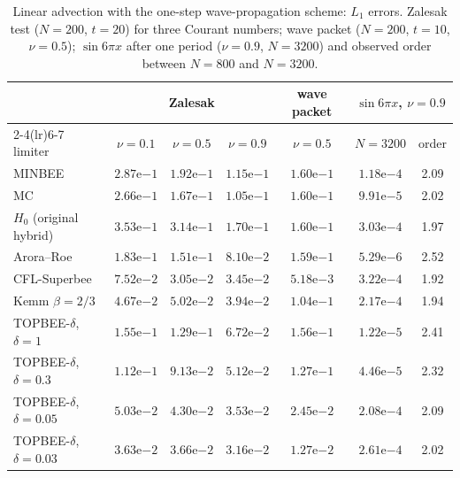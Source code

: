 \begin{table}[t]\centering\footnotesize\setlength{\tabcolsep}{3.5pt}
\caption{Linear advection with the one-step wave-propagation scheme: $L_1$ errors. Zalesak test ($N=200$, $t=20$) for three Courant numbers; wave packet ($N=200$, $t=10$, $\nu=0.5$); $\sin 6\pi x$ after one period ($\nu=0.9$, $N=3200$) and observed order between $N=800$ and $N=3200$.}\label{tab:adv}
\begin{tabular}{lcccccc}\toprule
 & \multicolumn{3}{c}{Zalesak} & wave packet & \multicolumn{2}{c}{$\sin 6\pi x$, $\nu=0.9$} \\ \cmidrule(lr){2-4}\cmidrule(lr){6-7}
limiter & $\nu=0.1$ & $\nu=0.5$ & $\nu=0.9$ & $\nu=0.5$ & $N=3200$ & order \\ \midrule
MINBEE & $2.87\mathrm{e}{-1}$ & $1.92\mathrm{e}{-1}$ & $1.15\mathrm{e}{-1}$ & $1.60\mathrm{e}{-1}$ & $1.18\mathrm{e}{-4}$ & 2.09 \\
MC & $2.66\mathrm{e}{-1}$ & $1.67\mathrm{e}{-1}$ & $1.05\mathrm{e}{-1}$ & $1.60\mathrm{e}{-1}$ & $9.91\mathrm{e}{-5}$ & 2.02 \\
$H_0$ (original hybrid) & $3.53\mathrm{e}{-1}$ & $3.14\mathrm{e}{-1}$ & $1.70\mathrm{e}{-1}$ & $1.60\mathrm{e}{-1}$ & $3.03\mathrm{e}{-4}$ & 1.97 \\
Arora--Roe & $1.83\mathrm{e}{-1}$ & $1.51\mathrm{e}{-1}$ & $8.10\mathrm{e}{-2}$ & $1.59\mathrm{e}{-1}$ & $5.29\mathrm{e}{-6}$ & 2.52 \\
CFL-Superbee & $7.52\mathrm{e}{-2}$ & $3.05\mathrm{e}{-2}$ & $3.45\mathrm{e}{-2}$ & $5.18\mathrm{e}{-3}$ & $3.22\mathrm{e}{-4}$ & 1.92 \\
Kemm $\beta=2/3$ & $4.67\mathrm{e}{-2}$ & $5.02\mathrm{e}{-2}$ & $3.94\mathrm{e}{-2}$ & $1.04\mathrm{e}{-1}$ & $2.17\mathrm{e}{-4}$ & 1.94 \\
TOPBEE-$\delta$, $\delta=1$ & $1.55\mathrm{e}{-1}$ & $1.29\mathrm{e}{-1}$ & $6.72\mathrm{e}{-2}$ & $1.56\mathrm{e}{-1}$ & $1.22\mathrm{e}{-5}$ & 2.41 \\
TOPBEE-$\delta$, $\delta=0.3$ & $1.12\mathrm{e}{-1}$ & $9.13\mathrm{e}{-2}$ & $5.12\mathrm{e}{-2}$ & $1.27\mathrm{e}{-1}$ & $4.46\mathrm{e}{-5}$ & 2.32 \\
TOPBEE-$\delta$, $\delta=0.05$ & $5.03\mathrm{e}{-2}$ & $4.30\mathrm{e}{-2}$ & $3.53\mathrm{e}{-2}$ & $2.45\mathrm{e}{-2}$ & $2.08\mathrm{e}{-4}$ & 2.09 \\
TOPBEE-$\delta$, $\delta=0.03$ & $3.63\mathrm{e}{-2}$ & $3.66\mathrm{e}{-2}$ & $3.16\mathrm{e}{-2}$ & $1.27\mathrm{e}{-2}$ & $2.61\mathrm{e}{-4}$ & 2.02 \\
\bottomrule\end{tabular}\end{table}
